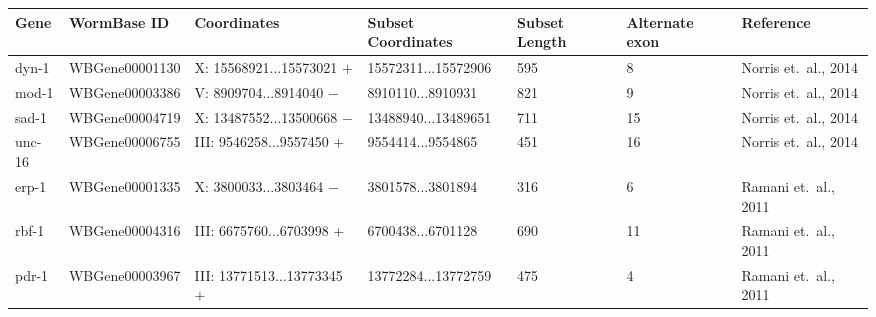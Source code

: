 \begin{table}[h!]
\centering
\begin{tabular}{|l|l|l|l|l|l|l|}
\hline
\textbf{Gene} & \textbf{WormBase ID} & \textbf{Coordinates} &
\textbf{Subset Coordinates} & \textbf{Subset Length} &
\textbf{Alternate exon} & \textbf{Reference} \\ \hline

dyn-1 & WBGene00001130 &
X: 15568921...15573021 $+$ &
15572311...15572906 & 595 & 8 &
Norris et.\ al., 2014 \\ \hline

mod-1 & WBGene00003386 &
V: 8909704...8914040 $-$ &
8910110...8910931 & 821 & 9 &
Norris et.\ al., 2014 \\ \hline

sad-1 & WBGene00004719 &
X: 13487552...13500668 $-$ &
13488940...13489651 & 711 & 15 &
Norris et.\ al., 2014 \\ \hline

unc-16 & WBGene00006755 &
III: 9546258...9557450 $+$ &
9554414...9554865 & 451 & 16 &
Norris et.\ al., 2014 \\ \hline

erp-1 & WBGene00001335 &
X: 3800033...3803464 $-$ &
3801578...3801894 & 316 & 6 &
Ramani et.\ al., 2011 \\ \hline

rbf-1 & WBGene00004316 &
III: 6675760...6703998 $+$ &
6700438...6701128 & 690 & 11 &
Ramani et.\ al., 2011 \\ \hline

pdr-1 & WBGene00003967 &
III: 13771513...13773345 $+$ &
13772284...13772759 & 475 & 4 &
Ramani et.\ al., 2011 \\ \hline

\end{tabular}
\end{table}
